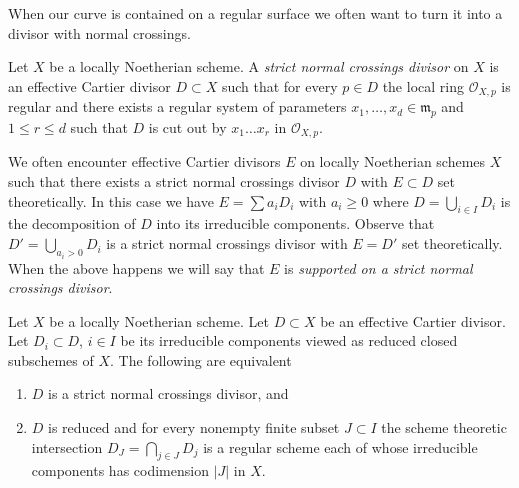 \noindent
When our curve is contained on a regular surface we often want to
turn it into a divisor with normal crossings.

\begin{definition}
\label{definition-strict-normal-crossings}
Let $X$ be a locally Noetherian scheme. A {\it strict normal crossings
divisor} on $X$ is an effective Cartier divisor $D \subset X$ such that
for every $p \in D$ the local ring $\mathcal{O}_{X, p}$ is regular
and there exists a regular system of parameters
$x_1, \ldots, x_d \in \mathfrak m_p$ and $1 \leq r \leq d$
such that $D$ is cut out by $x_1 \ldots x_r$ in $\mathcal{O}_{X, p}$.
\end{definition}

\noindent
We often encounter effective Cartier divisors $E$ on locally Noetherian
schemes $X$ such that there exists a strict normal crossings divisor $D$
with $E \subset D$ set theoretically.
In this case we have
$E = \sum a_i D_i$ with $a_i \geq 0$ where $D = \bigcup_{i \in I} D_i$
is the decomposition of $D$ into its irreducible components.
Observe that $D' = \bigcup_{a_i > 0} D_i$ is a strict normal crossings
divisor with $E = D'$ set theoretically.
When the above happens we will say that
$E$ is {\it supported on a strict normal crossings divisor}.

\begin{lemma}
\label{lemma-strict-normal-crossings}
Let $X$ be a locally Noetherian scheme. Let $D \subset X$ be an
effective Cartier divisor. Let $D_i \subset D$, $i \in I$ be its
irreducible components viewed as reduced closed subschemes of $X$.
The following are equivalent
\begin{enumerate}
\item $D$ is a strict normal crossings divisor, and
\item $D$ is reduced and for every nonempty finite subset $J \subset I$
the scheme theoretic intersection $D_J = \bigcap_{j \in J} D_j$ is a
regular scheme each of whose irreducible components has
codimension $|J|$ in $X$.
\end{enumerate}
\end{lemma}

